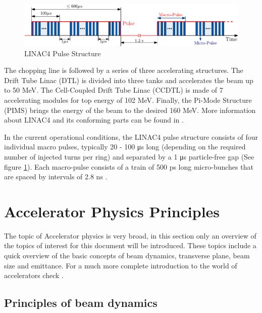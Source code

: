 \begin{figure}[h]
    \centering
    \includegraphics[width=1.0\columnwidth]{Figure_Linac4PulseStructure/Linac4_PulseStruct.pdf}
    \caption{LINAC4 Pulse Structure }
    \label{fig:Linac4PulseStruct}
\end{figure}

The chopping line is followed by a series of three accelerating structures. The Drift Tube Linac (DTL) is divided into three tanks and accelerates the beam up to 50 \si[]{\mega \electronvolt}. The Cell-Coupled Drift Tube Linac (CCDTL) is made of 7 accelerating modules for top energy of 102 \si[]{\mega \electronvolt}. Finally, the Pi-Mode Structure (PIMS) brings the energy of the beam to the desired 160 \si[]{\mega\electronvolt}. More information about LINAC4 and its conforming parts can be found in \parencite*[]{ref:Linac4Technical}.  

In the current operational conditions, the LINAC4 pulse structure consists of four individual macro pulses, typically 20 - 100 \si[]{\micro \second} long (depending on the required number of injected turns per ring) and separated by a 1 \si[]{\micro \second} particle-free gap (See figure \ref{fig:Linac4PulseStruct}). Each macro-pulse consists of a train of 500 \si[]{\pico \second} long micro-bunches that are spaced by intervals of 2.8 \si[]{\nano \second} \parencite*[]{ref:Linac4PulseStruct}.

\newpage

\section{Accelerator Physics Principles}
\label{sec:AccPhysPrinc}

The topic of Accelerator physics is very broad, in this section only an overview of the topics of interest for this document will be introduced. These topics include a quick overview of the basic concepts of beam dynamics, transverse plane, beam size and emittance. For a much more complete introduction to the world of accelerators check \parencite*[][]{ref:BookAccPhysics}.

\subsection{Principles of beam dynamics}
\label{subsec:PrincBeamDyn}

